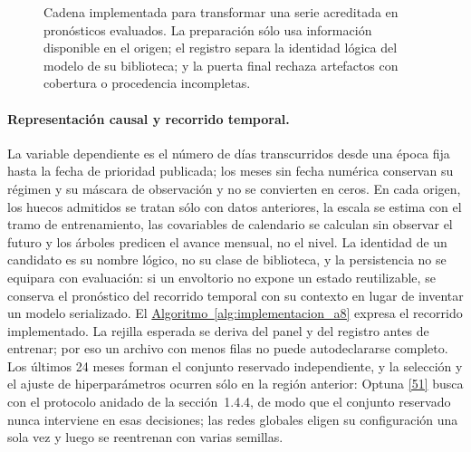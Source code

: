 \documentclass[12pt,letterpaper]{report}
\newcommand{\cita}[1]{\hyperref[bib:#1]{[#1]}}
\begin{document}
\begin{figure}[htbp]
\caption[Cadena implementada para el modelado]{Cadena implementada para transformar una
serie acreditada en pronósticos evaluados. La preparación sólo usa información disponible
en el origen; el registro separa la identidad lógica del modelo de su biblioteca; y la puerta
final rechaza artefactos con cobertura o procedencia incompletas.}
\label{fig:implementacion_a8}
\end{figure}

\paragraph{Representación causal y recorrido temporal.} La variable dependiente es el número de
días transcurridos desde una época fija hasta la fecha de prioridad publicada; los meses sin
fecha numérica conservan su régimen y su máscara de observación y no se convierten en ceros. En
cada origen, los huecos admitidos se tratan sólo con datos anteriores, la escala se estima con
el tramo de entrenamiento, las covariables de calendario se calculan sin observar el futuro y
los árboles predicen el avance mensual, no el nivel. La identidad de un candidato es su nombre
lógico, no su clase de biblioteca, y la persistencia no se equipara con evaluación: si un
envoltorio no expone un estado reutilizable, se conserva el pronóstico del recorrido temporal
con su contexto en lugar de inventar un modelo serializado. El
\hyperref[alg:implementacion_a8]{Algoritmo~\ref*{alg:implementacion_a8}} expresa el recorrido implementado. La rejilla esperada se deriva del panel y del registro antes de entrenar; por eso un archivo con menos filas no puede
autodeclararse completo. Los últimos 24 meses forman el conjunto reservado independiente, y la
selección y el ajuste de hiperparámetros ocurren sólo en la región anterior: Optuna \cita{51}
busca con el protocolo anidado de la sección~1.4.4, de modo que el conjunto reservado nunca interviene en esas decisiones; las redes globales eligen su configuración una sola vez y luego
se reentrenan con varias semillas.
\end{document}
